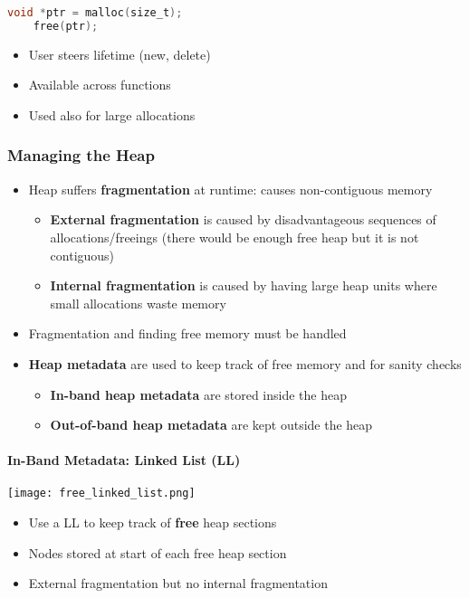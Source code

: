 \begin{lstlisting}[language={C}]
    void *ptr = malloc(size_t);
    free(ptr);                  
\end{lstlisting}
\begin{itemize}
    \item User steers lifetime (new, delete)
    \item Available across functions
    \item Used also for large allocations
\end{itemize}

\subsubsection{Managing the Heap}
\begin{itemize}
    \item Heap suffers \textbf{fragmentation} at runtime: causes non-contiguous memory
          \noindent\begin{itemize}
              \item \textbf{External fragmentation} is caused by disadvantageous sequences of allocations/freeings (there would be enough free heap but it is not contiguous)
              \item \textbf{Internal fragmentation} is caused by having large heap units where small allocations waste memory
          \end{itemize}
    \item Fragmentation and finding free memory must be handled
    \item \textbf{Heap metadata} are used to keep track of free memory and for sanity checks
          \noindent\begin{itemize}
              \item \textbf{In-band heap metadata} are stored inside the heap
              \item \textbf{Out-of-band heap metadata} are kept outside the heap
          \end{itemize}
\end{itemize}

\paragraph{In-Band Metadata: Linked List (LL)}
\texttt{[image: free\_linked\_list.png]}

\begin{itemize}
    \item Use a LL to keep track of \textbf{free} heap sections
    \item Nodes stored at start of each free heap section
    \item External fragmentation but no internal fragmentation
\end{itemize}

